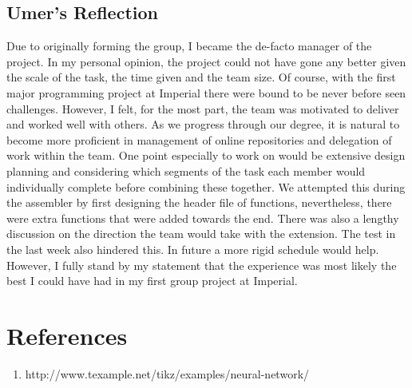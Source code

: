 \documentclass[11pt]{article}
\begin{document}
\subsection{Umer's Reflection}
Due to originally forming the group, I became the de-facto manager of the project. In my personal opinion, the project could not have gone any better given the scale of the task, the time given and the team size. Of course, with the first major programming project at Imperial there were bound to be never before seen challenges. However, I felt, for the most part, the team was motivated to deliver and worked well with others. As we progress through our degree, it is natural to become more proficient in management of online repositories and delegation of work within the team. One point especially to work on would be extensive design planning and considering which segments of the task each member would individually complete before combining these together. We attempted this during the assembler by first designing the header file of functions, nevertheless, there were extra functions that were added towards the end. There was also a lengthy discussion on the direction the team would take with the extension. The test in the last week also hindered this. In future a more rigid schedule would help. However, I fully stand by my statement that the experience was most likely the best I could have had in my first group project at Imperial. 

\section{References}
\begin{enumerate}
	\item http://www.texample.net/tikz/examples/neural-network/
\end{enumerate}
\end{document}
